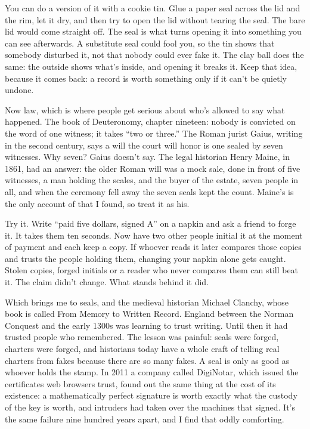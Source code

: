\documentclass[11pt,twoside]{article}
\theoremstyle{thielethm}
\theoremstyle{thieledef}
\theoremstyle{thieledef}
\theoremstyle{thieledef}
\theoremstyle{thielethm}
\theoremstyle{thieleobs}
\theoremstyle{thielethm}
\begin{document}
You can do a version of it with a cookie tin. Glue a paper seal across the lid and the rim, let it dry, and then try to open the lid without tearing the seal. The bare lid would come straight off. The seal is what turns opening it into something you can see afterwards. A substitute seal could fool you, so the tin shows that somebody disturbed it, not that nobody could ever fake it. The clay ball does the same: the outside shows what's inside, and opening it breaks it. Keep that idea, because it comes back: a record is worth something only if it can't be quietly undone.

Now law, which is where people get serious about who's allowed to say what happened. The book of Deuteronomy, chapter nineteen: nobody is convicted on the word of one witness; it takes ``two or three.'' The Roman jurist Gaius, writing in the second century, says a will the court will honor is one sealed by seven witnesses. Why seven? Gaius doesn't say. The legal historian Henry Maine, in 1861, had an answer: the older Roman will was a mock sale, done in front of five witnesses, a man holding the scales, and the buyer of the estate, seven people in all, and when the ceremony fell away the seven seals kept the count. Maine's is the only account of that I found, so treat it as his.

Try it. Write ``paid five dollars, signed A'' on a napkin and ask a friend to forge it. It takes them ten seconds. Now have two other people initial it at the moment of payment and each keep a copy. If whoever reads it later compares those copies and trusts the people holding them, changing your napkin alone gets caught. Stolen copies, forged initials or a reader who never compares them can still beat it. The claim didn't change. What stands behind it did.

Which brings me to seals, and the medieval historian Michael Clanchy, whose book is called From Memory to Written Record. England between the Norman Conquest and the early 1300s was learning to trust writing. Until then it had trusted people who remembered. The lesson was painful: seals were forged, charters were forged, and historians today have a whole craft of telling real charters from fakes because there are so many fakes. A seal is only as good as whoever holds the stamp. In 2011 a company called DigiNotar, which issued the certificates web browsers trust, found out the same thing at the cost of its existence: a mathematically perfect signature is worth exactly what the custody of the key is worth, and intruders had taken over the machines that signed. It's the same failure nine hundred years apart, and I find that oddly comforting.
\end{document}
